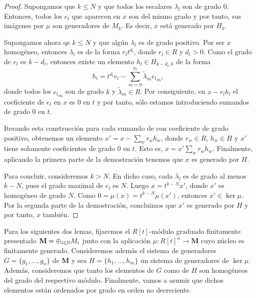 \begin{proof}
	Supongamos que \(k \leq N\) y que todos los escalares \(\lambda_l\) son de grado \(0\). Entonces, todos los \(e_l\) que aparecen en \(x\) son del mismo grado y por tanto, sus imágenes por \(\mu\) son generadores de \(M_k\). Es decir, \(x\) está generado por \(H_k\).
	
	Supongamos ahora qe \(k \leq N\) y que algún \(\lambda_l\) es de grado positivo. Por ser \(x\) homogéneo, entonces \(\lambda_l\) es de la forma \(r_l t^{d_l}\), donde \(r_l \in R\) y \(d_l > 0\). Como el grado de \(e_l\) es \(k - d_l\), entonces existe un elemento \(h_l \in H_{k-d_l,k}\) de la forma 
	\[
		h_l = t^{d_l}e_l - \sum_{m=0}^{n_l} \tilde{\lambda}_m {e_l}_m,
	\]
	donde todos los \({e_l}_m\) son de grado \(k\) y \(\tilde{\lambda}_m \in R\). Por consiguiente, en \(x - r_l h_l\) el coeficiente de \(e_l\) en \(x\) es \(0\) en \(t\) y por tanto, sólo estamos introduciendo sumandos de grado \(0\) en \(t\).
	
	Iterando esta construcción para cada sumando de con coeficiente de grado positivo, obtenemos un elemento \(x' = x - \sum_w r_w h_w\), donde \(r_w \in R\), \(h_w \in H\) y \(x'\) tiene solamente coeficientes de grado \(0\) en \(t\). Esto es, \(x = x' \sum_w r_w h_w\). Finalmente, aplicando la primera parte de la demostración tenemos que \(x\) es generado por \(H\).
	
	Para concluir, consideremos \(k > N\). En dicho caso, cada \(\lambda_l\) es de grado al menos \(k - N\), pues el grado maximal de \(e_l\) es \(N\). Luego \(x = t^{k-N}x'\), donde \(x'\) es homogéneo de grado \(N\). Como \(0 = \mu(x) = t^{k-N} \mu(x')\), entonces \(x' \in \ker \mu\). Por la segunda parte de la demostración, concluimos que \(x'\) es generado por \(H\) y por tanto, \(x\) también.
\end{proof}

Para los siguientes dos lemas, fijaremos el \(R[t]\)-módulo graduado finitamente presentado \(\mathbf{M} = \oplus_{i \in \mathbb{N}} M_i\) junto con la aplicación \(\mu : R[t]^n \to \mathbf{M}\) cuyo núcleo es finitamente generado. Consideremos además el sistema de generadores \(G = \{g_1, \ldots, g_n\}\) de \(\mathbf{M}\) y sea \(H = \{h_1, \ldots, h_m\}\) un sistema de generadores de \(\ker \mu\). Además, consideremos que tanto los elementos de \(G\) como de \(H\) son homogéneos del grado del respectivo módulo. Finalmente, vamos a asumir que dichos elementos están ordenados por grado en orden no decreciente.

